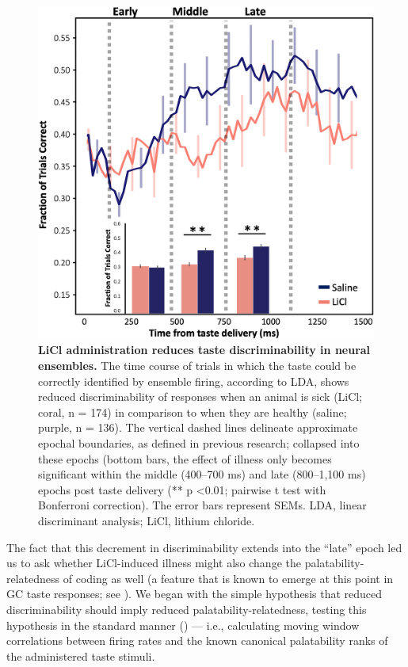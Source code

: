 \begin{refsection}
\begin{figure}
\includegraphics[width=\linewidth]{stone_2022_figs/journal.pbio.3001537.g005.png} 
\caption{\textbf{LiCl administration reduces taste discriminability in neural ensembles.} The time course of trials in which the taste could be correctly identified by ensemble firing, according to LDA, shows reduced discriminability of responses when an animal is sick (LiCl; coral, n = 174) in comparison to when they are healthy (saline; purple, n = 136). The vertical dashed lines delineate approximate epochal boundaries, as defined in previous research; collapsed into these epochs (bottom bars, the effect of illness only becomes significant within the middle (400–700 ms) and late (800–1,100 ms) epochs post taste delivery (** p \textless 0.01; pairwise t test with Bonferroni correction). The error bars represent SEMs. LDA, linear discriminant analysis; LiCl, lithium chloride.
}
\label{fig:wrapfig}
\end{figure}


The fact that this decrement in discriminability extends into the “late” epoch led us to ask whether LiCl-induced illness might also change the palatability-relatedness of coding as well (a feature that is known to emerge at this point in GC taste responses; see \cite{katz-a,katz2001a}). We began with the simple hypothesis that reduced discriminability should imply reduced palatability-relatedness, testing this hypothesis in the standard manner (\cite{sadacca2016a,levitan2019a,li2016a,piette2012a}) --- i.e., calculating moving window correlations between firing rates and the known canonical palatability ranks of the administered taste stimuli.


\end{refsection}
